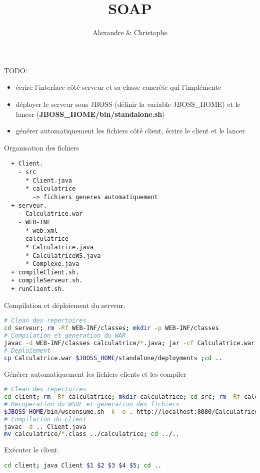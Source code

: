 \documentclass{article}
\title{\vspace{-5ex}SOAP\vspace{-2ex}}
\author{Alexandre \bsc{Brehmer} \& Christophe \bsc{Cluizel}}
\begin{document}
\maketitle
\vspace{-6ex}

TODO:
\begin{itemize}
  \item écrire l'interface côté serveur et sa classe concrète qui l'implémente
  \item déployer le serveur sous JBOSS (définir la variable JBOSS\_HOME) et le lancer (\textbf{JBOSS\_HOME/bin/standalone.sh})
  \item générer automatiquement les fichiers côté client, écrire le client et le lancer
\end{itemize}

Organisation des fichiers
\begin{lstlisting}
  + Client.
    - src
      * Client.java
      * calculatrice
        -> fichiers generes automatiquement
  + serveur.
    - Calculatrice.war
    - WEB-INF
      * web.xml
    - calculatrice
      * Calculatrice.java
      * CalculatriceWS.java
      * Complexe.java
  + compileClient.sh.
  + compileServeur.sh.
  + runClient.sh.
\end{lstlisting}

Compilation et déploiement du serveur.
\begin{lstlisting}[language=bash]
# Clean des repertoires
cd serveur; rm -Rf WEB-INF/classes; mkdir -p WEB-INF/classes
# Compilation et generation du WAR
javac -d WEB-INF/classes calculatrice/*.java; jar -cf Calculatrice.war WEB-INF;
# Deploiement
cp Calculatrice.war $JBOSS_HOME/standalone/deployments ;cd ..
\end{lstlisting}

Générer automatiquement les fichiers clients et les compiler
\begin{lstlisting}[language=bash]
# Clean des repertoires
cd client; rm -Rf calculatrice; mkdir calculatrice; cd src; rm -Rf calculatrice
# Recuperation du WSDL et generation des fichiers
$JBOSS_HOME/bin/wsconsume.sh -k -o . http://localhost:8080/Calculatrice/CalculatriceWS?wsdl
# Compilation du client
javac -d .. Client.java
mv calculatrice/*.class ../calculatrice; cd ../..
\end{lstlisting}

Exécuter le client.
\begin{lstlisting}[language=bash]
cd client; java Client $1 $2 $3 $4 $5; cd ..
\end{lstlisting}
\end{document}
